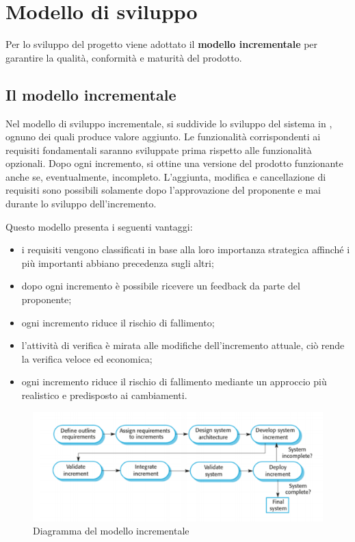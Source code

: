 \documentclass[../piano-di-progetto.tex]{subfiles}
\begin{document}
\section{Modello di sviluppo}
Per lo sviluppo del progetto viene adottato il \textbf{modello incrementale} per garantire la qualità, conformità e maturità del prodotto.
\subsection{Il modello incrementale}
Nel modello di sviluppo incrementale, si suddivide lo sviluppo del sistema in , ognuno dei quali produce valore aggiunto. Le funzionalità corrispondenti ai requisiti fondamentali saranno sviluppate prima rispetto alle funzionalità opzionali. Dopo ogni incremento, si ottine una versione del prodotto funzionante anche se, eventualmente, incompleto. L’aggiunta, modifica e cancellazione di requisiti sono possibili solamente dopo l'approvazione del proponente e mai durante lo sviluppo dell'incremento.

Questo modello presenta i seguenti vantaggi:
\begin{itemize}
    \item i requisiti vengono classificati in base alla loro importanza strategica affinché i più importanti abbiano precedenza sugli altri;
    \item dopo ogni incremento è possibile ricevere un feedback da parte del proponente;
    \item ogni incremento riduce il rischio di fallimento;
    \item l'attività di verifica è mirata alle modifiche dell'incremento attuale, ciò rende la verifica veloce ed economica;
    \item ogni incremento riduce il rischio di fallimento mediante un approccio più realistico e predisposto ai cambiamenti.

\end{itemize}

\begin{figure}[H]
	\centering
    \includegraphics[width=16cm]{img/modello-incrementale.png}
    \caption{Diagramma del modello incrementale} 
	\label{fig:modello-incrementale}
  \end{figure}
  
\end{document}
